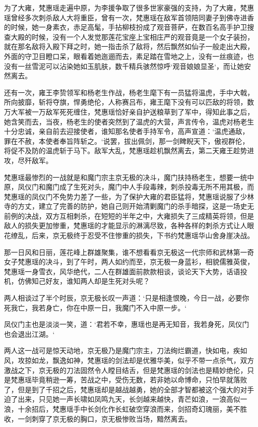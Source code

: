 为了大雍，梵惠瑶走遍中原，为李援争取了很多世家豪强的支持，为了大雍，梵惠瑶曾经多次刺杀敌人大将重臣，曾有一次，梵惠瑶在敌军首领陪同妻子到佛寺进香的时候，她一身素衣，赤足高髦，手拈柳枝扮成了观音菩萨，在数百名高手护卫搜查大殿的时候，没有一个人发觉那莲花宝座上宝相庄严的观音竟是一个女子装扮，就在那名敌将入殿下拜之时，她一指击杀了敌将，然后飘然如仙子一般走出大殿，外面的守卫目瞪口呆，眼看着她迤逦而去，素足踏在雪地之上，没有一丝痕迹，也没有一丝雪泥可以沾染她如玉肌肤，数千精兵骇然惊呼‘观音娘娘显圣‘，而让她安然离去。

还有一次，雍王李贽领军和杨老生作战，杨老生麾下有一员猛将温虎，手中大戟，所向披靡，斩将夺旗，悍勇绝伦，人称赛吕布，雍王麾下没有可以匹敌的将领，数万大军被一万敌军死死缠住，梵惠瑶恰好亲自护送粮草到了军中，得知此事之后，她含笑而去，当夜，杨老生的使者突然到了温虎的大营，声言传令，温虎对杨老生十分忠诚，亲自前去迎接使者，谁知那名使者手持军令，高声宣道：‘温虎通敌，罪在不赦，本使者奉旨阵斩之。‘说罢，拔出佩剑，那一剑睥睨天下，傲视群伦，将促不及防的温虎斩于马下。敌军大乱，梵惠瑶趁机飘然离去，第二天雍王趁势进攻，尽歼敌军。

梵惠瑶最惨烈的一战就是和魔门宗主京无极的决斗，魔门扶持杨老生，想要一统中原，凤仪门和魔门成了生死对头，魔门中人手段毒辣，刺杀投毒无所不用其极，而梵惠瑶的凤仪门不免势力差了一些，为了保护大雍的君臣猛将，梵惠瑶说服了少林寺的方丈，建立了完善的防护，她自己则开始清剿魔门的杀手暗探，这是一场史无前例的决战，双方互相刺杀，在短短的半年之中，大雍损失了三成精英将领，但是敌人的损失更加惨重，梵惠瑶的才能显示的淋漓尽致，各种各样的刺杀方式让人眼花缭乱，后来，京无极终于忍受不住惨重的损失，下书约梵惠瑶华山舍身崖决战。

那一日风和日丽，莲花峰上群雄聚集，谁不想看看京无极这一代宗师和武林第一奇女子梵惠瑶的决斗，到了午时，两人如约而至，京无极一身蓝衫，相貌儒雅英俊，梵惠瑶一身雪衣，风华绝代，二人在群雄面前款款相谈，谈论天下大势，话语投机，仿佛知己好友，谁知两人却是生死对头呢？

两人相谈过了半个时辰，京无极长叹一声道：‘只是相逢恨晚，今日一战，必要你死我亡，我若身亡，你在中原一日，我魔门不入中原一步。‘

凤仪门主也是淡淡一笑，道：‘君若不幸，惠瑶也是再无知音，我若身死，凤仪门也会退出江湖。‘

两人这一战可是惊天动地，京无极乃是魔门宗主，刀法绚烂霸道，快如电，疾如风，攻掠如龙，飘逸如神，梵惠瑶的剑法却是优雅华美，似乎不带一点杀气，双方激战之下，京无极的刀法固然令人瞠目结舌，但是梵惠瑶的剑法也是精妙绝伦，只是梵惠瑶毕竟稍逊一筹，苦战之中，受伤无数，若非她以命博命，只怕早就落败了，但是到了千招之后，梵惠瑶却是越战越勇，她的全部才智都被这个强大的对手迫了出来，只见她一声长啸如凤鸣九天，长剑越来越快，青芒如浪，一浪高似一浪，十余招后，梵惠瑶手中长剑化作长虹破空穿浪而来，剑招奇幻瑰丽，美不胜收，一剑刺穿了京无极的胸口，京无极惨败当场，黯然离去。

